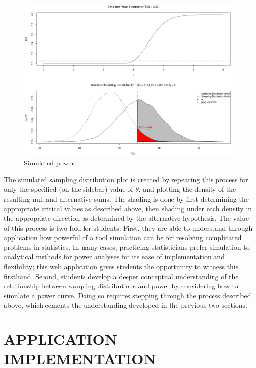 \documentclass{TISE}
\begin{document}
\begin{figure}[H]
	\centering
	\includegraphics[width=\textwidth]{sim.png}
	\caption{Simulated power}
\end{figure}
 
The simulated sampling distribution plot is created by repeating this process for only the specified (on the sidebar) value of $\theta$, and plotting the density of the resulting null and alternative sums. The shading is done by first determining the appropriate critical values as described above, then shading under each density in the appropriate direction as determined by the alternative hypothesis. The value of this process is two-fold for students. First, they are able to understand through application how powerful of a tool simulation can be for resolving complicated problems in statistics. In many cases, practicing statisticians prefer simulation to analytical methods for power analyses for its ease of implementation and flexibility; this web application gives students the opportunity to witness this firsthand. Second, students develop a deeper conceptual understanding of the relationship between sampling distributions and power by considering how to simulate a power curve. Doing so requires stepping through the process described above, which cements the understanding developed in the previous two sections. 

\section{APPLICATION IMPLEMENTATION}
\end{document}
